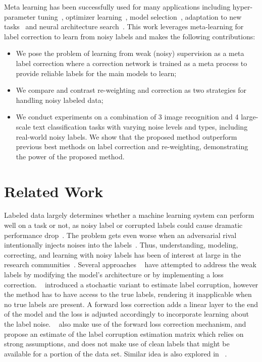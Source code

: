 Meta learning has been successfully used for many applications
including hyper-parameter tuning~\cite{maclaurin2015gradient},
optimizer learning~\cite{DBLP:conf/iclr/RaviL17}, model
selection~\cite{pedregosa2016hyperparameter}, adaptation to new
tasks~\cite{finn2017model} and neural architecture
search~\cite{liu2018darts}. This work leverages meta-learning for
label correction to learn from noisy labels and makes the following
contributions:
\begin{itemize}
\item We pose the problem of learning from weak (noisy) supervision as a meta label correction where a 
  correction network is trained as a meta process to provide reliable labels for the main models to learn;
 \item We compare and contrast re-weighting and correction as two strategies for handling noisy labeled data;
\item We conduct experiments on a combination of 3 image recognition  and 4 large-scale text classification tasks with varying noise levels and types, including real-world noisy labels. We show that  the proposed method outperform previous best methods on label
  correction and re-weighting, demonstrating the power of the proposed method.
\end{itemize}

\section{Related Work}
\label{sec:relatedwork}



Labeled data largely determines whether a machine learning system can
perform well on a task or not, as noisy label or corrupted labels
could cause dramatic performance drop~\cite{nettleton2010study}. The
problem gets even worse when an adversarial rival intentionally
injects noises into the labels~\cite{reed2014training}. Thus,
understanding, modeling, correcting, and learning with noisy labels
has been of interest at large in the research
communities~\cite{natarajan2013learning, frenay2013classification}.
Several approaches ~\cite{mnih2012learning, patrini2017making,sukhbaatar2014training, larsen1998design} have
attempted to address the weak labels by modifying the model's
architecture or by implementing a loss
correction. ~\cite{sukhbaatar2014training} introduced a stochastic
variant to estimate label corruption, however the method has to have
access to the true labels, rendering it inapplicable when no true
labels are present. A forward loss correction adds a linear layer to
the end of the model and the loss is adjusted accordingly to
incorporate learning about the label noise. ~\cite{patrini2017making}
also make use of the forward loss correction mechanism, and propose an
estimate of the label corruption estimation matrix which relies on
strong assumptions, and does not make use of clean labels that might
be available for a portion of the data set. Similar idea is also
explored in ~\cite{goldberger2016training}.

